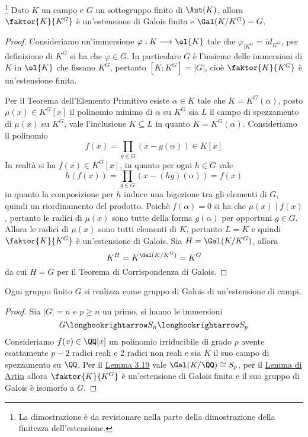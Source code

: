 \documentclass[11pt]{scrartcl}
\begin{document}
\begin{lemma}
    \footnote{
        La dimostrazione è da revisionare nella parte della dimostrazione 
        della finitezza dell'estensione.
    }
    \label{lemma3.20}
    Dato $K$ un campo e $G$ un sottogruppo finito di $\Aut(K)$, allora 
    $\faktor{K}{K^G}$ è un'estensione di Galois finita e $\Gal(K/K^G) = G$.
\end{lemma}

\begin{proof}
    Consideriamo un'immersione $\varphi: K \longrightarrow \ol{K}$ tale che
    $\varphi_{\mid K^G} = id_{K^G}$, per definizione di $K^G$ si ha che 
    $\varphi \in G$. In particolare $G$ è l'insieme delle immersioni di $K$
    in $\ol{K}$ che fissano $K^G$, pertanto $[K:K^G] = |G|$, cioè $\faktor{K}{K^G}$
    è un'estensione finita. 

    Per il Teorema dell'Elemento Primitivo esiste $\alpha \in K$ tale che 
    $K = K^G(\alpha)$, posto $\mu(x) \in K^G[x]$ il polinomio minimo di $\alpha$
    su $K^G$ sia $L$ il campo di spezzamento di $\mu(x)$ su $K^G$, vale
    l'inclusione $K \subseteq L$ in quanto $K = K^G(\alpha)$. Consideriamo 
    il polinomio 
    \[
        f(x) = \prod_{g \in G}(x - g(\alpha)) \in K[x]
    \]
    In realtà si ha $f(x) \in K^G[x]$, in quanto per ogni $h \in G$ vale 
    \[
        h(f(x)) = \prod_{g \in G}(x - (hg)(\alpha)) = f(x)
    \]
    in quanto la composizione per $h$ induce una bigezione tra gli elementi di $G$,
    quindi un riordinamento del prodotto. Poichè $f(\alpha) = 0$ si ha che
    $\mu(x)\mid f(x)$, pertanto le radici di $\mu(x)$ sono tutte della forma
    $g(\alpha)$ per opportuni $g \in G$. Allora le radici di $\mu(x)$ sono
    tutti elementi di $K$, pertanto $L = K$ e quindi $\faktor{K}{K^G}$ è 
    un'estensione di Galois. Sia $H = \Gal(K/K^G)$, allora
    \[
        K^H = K^{\Gal(K/K^G)} = K^G
    \]
    da cui $H = G$ per il Teorema di Corrispondenza di Galois.
\end{proof}

\begin{proposition}
    Ogni gruppo finito $G$ si realizza come gruppo di Galois di un'estensione
    di campi.
\end{proposition}

\begin{proof}
    Sia $|G| = n$ e $p \geq n$ un primo, si hanno le immersioni
    \[
        G \longhookrightarrow S_n \longhookrightarrow S_p
    \]
    Consideriamo $f(x) \in \QQ[x]$ un polinomio irriducibile di grado $p$
    avente esattamente $p - 2$ radici reali e 2 radici non reali e sia $K$ 
    il suo campo di spezzamento su $\QQ$. Per il \hyperref[lemma3.19]{Lemma 3.19}
    vale $\Gal(K/\QQ) \cong S_p$, per il \hyperref[lemma3.20]{Lemma di Artin}
    allora $\faktor{K}{K^G}$ è un'estensione di Galois finita e il suo gruppo
    di Galois è isomorfo a $G$.
\end{proof}
\end{document}
